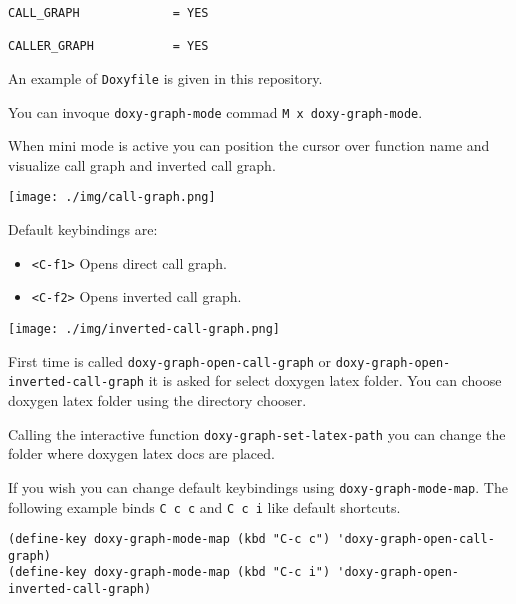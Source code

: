 \documentclass[11pt]{article}
\begin{document}
\begin{verbatim}
CALL_GRAPH             = YES

CALLER_GRAPH           = YES
\end{verbatim}

An example of \texttt{Doxyfile} is given in this repository.

You can invoque \texttt{doxy-graph-mode} commad \texttt{M x doxy-graph-mode}.

When mini mode is active you can position the cursor over function
name and visualize call graph and inverted call graph.

\begin{center}
\texttt{[image: ./img/call-graph.png]}
\end{center}

Default keybindings are:

\begin{itemize}
\item \texttt{<C-f1>} Opens direct call graph.
\item \texttt{<C-f2>} Opens inverted call graph.
\end{itemize}

\begin{center}
\texttt{[image: ./img/inverted-call-graph.png]}
\end{center}

First time is called \texttt{doxy-graph-open-call-graph} or
\texttt{doxy-graph-open-inverted-call-graph} it is asked for select doxygen
latex folder. You can choose doxygen latex folder using the directory
chooser.

Calling the interactive function \texttt{doxy-graph-set-latex-path} you can
change the folder where doxygen latex docs are placed.

If you wish you can change default keybindings using
\texttt{doxy-graph-mode-map}. The following example binds \texttt{C c c} and \texttt{C c i}
like default shortcuts.

\begin{verbatim}
(define-key doxy-graph-mode-map (kbd "C-c c") 'doxy-graph-open-call-graph)
(define-key doxy-graph-mode-map (kbd "C-c i") 'doxy-graph-open-inverted-call-graph)
\end{verbatim}
\end{document}
